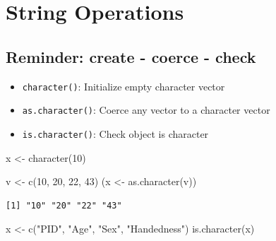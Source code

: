 \documentclass[
]{book}
\newenvironment{Shaded}{\begin{snugshade}}{\end{snugshade}}
\newcommand{\DecValTok}[1]{\textcolor[rgb]{0.00,0.00,0.81}{#1}}
\newcommand{\FunctionTok}[1]{\textcolor[rgb]{0.00,0.00,0.00}{#1}}
\newcommand{\NormalTok}[1]{#1}
\newcommand{\OtherTok}[1]{\textcolor[rgb]{0.56,0.35,0.01}{#1}}
\newcommand{\StringTok}[1]{\textcolor[rgb]{0.31,0.60,0.02}{#1}}
\providecommand{\tightlist}{%
  \setlength{\itemsep}{0pt}\setlength{\parskip}{0pt}}
\begin{document}
\hypertarget{stringops}{%
\chapter{String Operations}\label{stringops}}

\hypertarget{reminder-create---coerce---check}{%
\section{Reminder: create - coerce - check}\label{reminder-create---coerce---check}}

\begin{itemize}
\tightlist
\item
  \texttt{character()}: Initialize empty character vector
\item
  \texttt{as.character()}: Coerce any vector to a character vector
\item
  \texttt{is.character()}: Check object is character
\end{itemize}

\begin{Shaded}
\begin{Highlighting}[]
\NormalTok{x }\OtherTok{\textless{}{-}} \FunctionTok{character}\NormalTok{(}\DecValTok{10}\NormalTok{)}
\end{Highlighting}
\end{Shaded}

\begin{Shaded}
\begin{Highlighting}[]
\NormalTok{v }\OtherTok{\textless{}{-}} \FunctionTok{c}\NormalTok{(}\DecValTok{10}\NormalTok{, }\DecValTok{20}\NormalTok{, }\DecValTok{22}\NormalTok{, }\DecValTok{43}\NormalTok{)}
\NormalTok{(x }\OtherTok{\textless{}{-}} \FunctionTok{as.character}\NormalTok{(v))}
\end{Highlighting}
\end{Shaded}

\begin{verbatim}
[1] "10" "20" "22" "43"
\end{verbatim}

\begin{Shaded}
\begin{Highlighting}[]
\NormalTok{x }\OtherTok{\textless{}{-}} \FunctionTok{c}\NormalTok{(}\StringTok{"PID"}\NormalTok{, }\StringTok{"Age"}\NormalTok{, }\StringTok{"Sex"}\NormalTok{, }\StringTok{"Handedness"}\NormalTok{)}
\FunctionTok{is.character}\NormalTok{(x)}
\end{Highlighting}
\end{Shaded}
\end{document}
